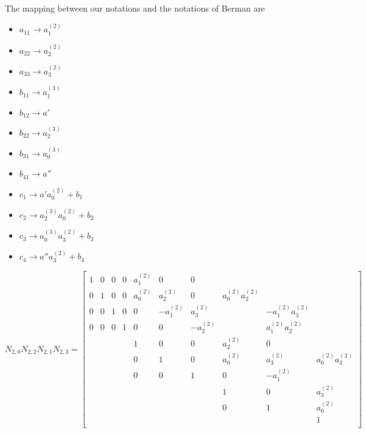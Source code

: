 \documentclass{article}
\begin{document}
The mapping between our notations and the notations of Berman are
\begin{itemize}
    \item $a_{11}\rightarrow{a_{1}^{(2)}}$
    \item $a_{22}\rightarrow{a_{2}^{(2)}}$
    \item $a_{33}\rightarrow{a_{3}^{(2)}}$
    \item $b_{11}\rightarrow{a_{1}^{(3)}}$
    \item $b_{12}\rightarrow{a'}$
    \item $b_{22}\rightarrow{a_{2}^{(3)}}$
    \item $b_{31}\rightarrow{a_{0}^{(3)}}$
    \item $b_{41}\rightarrow{a''}$
    \item $c_{1}\rightarrow{a'a_0^{(2)}+b_{1}}$
    \item $c_{2}\rightarrow{a_2^{(3)}a_0^{(2)}+b_{2}}$
    \item $c_{3}\rightarrow{a_0^{(3)}a_3^{(2)}+b_{3}}$
    \item $c_{4}\rightarrow{a''a_3^{(2)}+b_{4}}$
\end{itemize}
\[
N_{2,0}N_{2,2}N_{2,1}N_{2,3}=
  \begin{bmatrix}
    1 & 0 & 0 & 0 & a_1^{(2)} & 0 & 0 &  &  &  \\
    0 & 1 & 0 & 0 & a_0^{(2)} & a_2^{(2)} & 0 & a_0^{(2)}a_2^{(2)} &  &  \\
    0 & 0 & 1 & 0 & 0 & -a_1^{(2)} & a_3^{(2)} &  & -a_1^{(2)}a_3^{(2)} &  \\
    0 & 0 & 0 & 1 & 0 & 0 & -a_2^{(2)} &  & a_1^{(2)}a_2^{(2)} &  \\
    & & & & 1 & 0 & 0 & a_2^{(2)} & 0 &  \\
    & & & & 0 & 1 & 0 & a_0^{(2)} & a_3^{(2)} & a_0^{(2)}a_3^{(2)}\\
    & & & & 0 & 0 & 1 & 0 & -a_1^{(2)} &  \\
    & & & & & & & 1 & 0 & a_3^{(2)} \\
    & & & & & & & 0 & 1 & a_0^{(2)} \\
    & & & & & & & & & 1 \\
  \end{bmatrix}
\]
\end{document}
